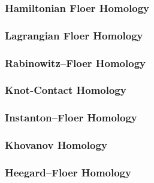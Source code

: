 \documentclass[a4paper]{article}
\theoremstyle{definition}
\theoremstyle{definition}
\theoremstyle{remark}
\theoremstyle{remark}
\theoremstyle{remark}
\begin{document}
\subsubsection{Hamiltonian Floer Homology}

\subsubsection{Lagrangian Floer Homology}

\subsubsection{Rabinowitz--Floer Homology}

\subsubsection{Knot-Contact Homology}

\subsubsection{Instanton--Floer Homology}

\subsubsection{Khovanov Homology}

\subsubsection{Heegard--Floer Homology}

{}

\end{document}
